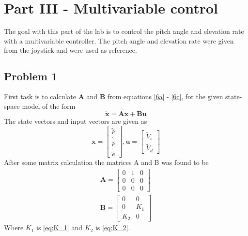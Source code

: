 \section{Part III - Multivariable control} \label{sec:part3}
The goal with this part of the lab is to control the pitch angle and elevation rate with a multivariable controller. The pitch angle and elevation rate were given from the joystick and were used as reference. 

\subsection{Problem 1}
First task is to calculate \textbf{A} and \textbf{B} from equations \eqref{6a} - \eqref{6c}, for the given state-space model of the form 
\begin{equation*} 
    \boldsymbol{\dot{x} = Ax + Bu}
\end{equation*}
The state vectors and input vectors are given as
\[
    \boldsymbol{x}=\begin{bmatrix}
    \tilde{p}\\
    \dot{\tilde{p}}\\
    \dot{\tilde{e}}
  \end{bmatrix},
\boldsymbol{u}= \begin{bmatrix}
   \tilde{V}_s\\
   \tilde{V}_d
\end{bmatrix}
\]
After some matrix calculation the matrices A and B was found to be
\begin{subequations}
\begin{align}
    \boldsymbol{A} = \begin{bmatrix} \label{A2 Matrix}
    0 & 1 & 0 \\
    0 & 0 & 0 \\
    0 & 0 & 0
    \end{bmatrix}
\\ 
    \boldsymbol{B} = \begin{bmatrix} \label{B2 Matrix}
    0 & 0 \\
    0 & K_1 \\
    K_2 & 0 
    \end{bmatrix}
    \end{align}
    \end{subequations}
Where $K_1$ is \eqref{eq:K_1} and $K_2$ is \eqref{eq:K_2}. 

